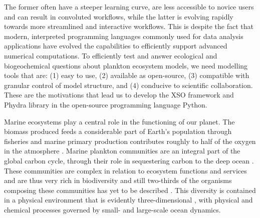 \documentclass[journal abbreviation, manuscript]{copernicus}
\begin{document}
The former often have a steeper learning curve, are less accessible to novice users and can result in convoluted workflows, while the latter is evolving rapidly towards more streamlined and interactive workflows. This is despite the fact that modern, interpreted programming languages commonly used for data analysis applications have evolved the capabilities to efficiently support advanced numerical computations.
To efficiently test and answer ecological and biogeochemical questions about plankton ecosystem models, we need modelling tools that are: (1) easy to use, (2) available as open-source, (3) compatible with granular control of model structure, and (4) conducive to scientific collaboration. These are the motivations that lead us to develop the XSO framework and Phydra library in the open-source programming language Python.

Marine ecosystems play a central role in the functioning of our planet. The biomass produced feeds a considerable part of Earth’s population through fisheries \citep{Stock2017} and marine primary production contributes roughly to half of the oxygen in the atmosphere \citep{Field1998PrimaryComponents}. Marine plankton communities are an integral part of the global carbon cycle, through their role in sequestering carbon to the deep ocean \citep{Falkowski1998BiogeochemicalProduction}. These communities are complex in relation to ecosystem functions and services and are thus very rich in biodiversity and still two-thirds of the organisms composing these communities has yet to be described \citep{Appeltans2012TheDiversity}. This diversity is contained in a physical environment that is evidently three-dimensional \citep{Levin2017AddingConservation}, with physical and chemical processes governed by small- and large-scale ocean dynamics. 
\end{document}
